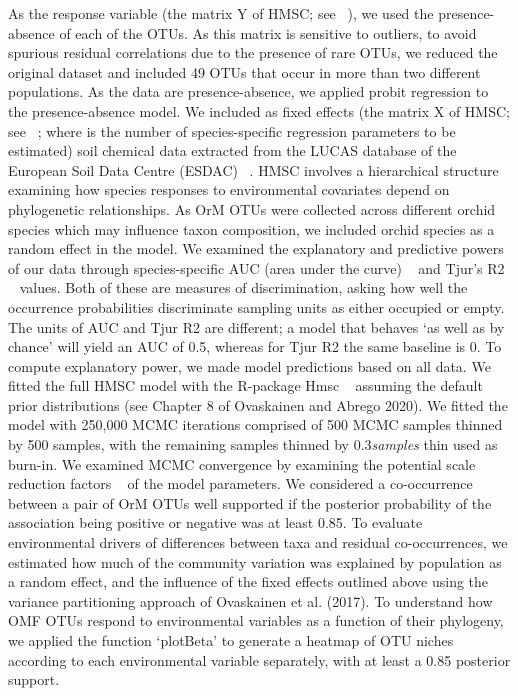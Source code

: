 As the response variable (the matrix Y of HMSC; see ~\citep{ovaskainen2017}), we used the presence-absence of each of the OTUs. As this matrix is sensitive to outliers, to avoid spurious residual correlations due to the presence of rare OTUs, we reduced the original dataset and included 49 OTUs that occur in more than two different populations. As the data are presence-absence, we applied probit regression to the presence-absence model. We included as fixed effects (the matrix X of HMSC; see ~\citep{ovaskainen2017}; where is the number of species-specific regression parameters to be estimated) soil chemical data extracted from the LUCAS database of the European Soil Data Centre (ESDAC) ~\citep{ballabio2019}. HMSC involves a hierarchical structure examining how species responses to environmental covariates depend on phylogenetic relationships. As OrM OTUs were collected across different orchid species which may influence taxon composition, we included orchid species as a random effect in the model.
We examined the explanatory and predictive powers of our data through species-specific AUC (area under the curve) ~\citep{pearce2000} and Tjur’s R2 ~\citep{tjur2009} values. Both of these are measures of discrimination, asking how well the occurrence probabilities discriminate sampling units as either occupied or empty. The units of AUC and Tjur R2 are different; a model that behaves ‘as well as by chance’ will yield an AUC of 0.5, whereas for Tjur R2 the same baseline is 0. To compute explanatory power, we made model predictions based on all data. We fitted the full HMSC model with the R-package Hmsc ~\citep{tikhonov2020} assuming the default prior distributions (see Chapter 8 of Ovaskainen and Abrego 2020). We fitted the model with 250,000 MCMC iterations comprised of 500 MCMC samples thinned by 500 samples, with the remaining samples thinned by 0.3\emph{samples} thin used as burn-in. We examined MCMC convergence by examining the potential scale reduction factors ~\citep{gelman1992} of the model parameters. We considered a co-occurrence between a pair of OrM OTUs well supported if the posterior probability of the association being positive or negative was at least 0.85. To evaluate environmental drivers of differences between taxa and residual co-occurrences, we estimated how much of the community variation was explained by population as a random effect, and the influence of the fixed effects outlined above using the variance partitioning approach of Ovaskainen et al. (2017). To understand how OMF OTUs respond to environmental variables as a function of their phylogeny, we applied the function ‘plotBeta’ to generate a heatmap of OTU niches according to each environmental variable separately, with at least a 0.85 posterior support.

